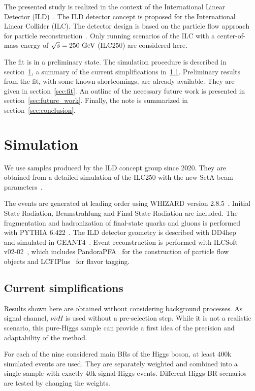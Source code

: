 \documentclass[11pt, hidelinks, a4paper]{scrartcl}
\newcommand{\eV}{\text{e\kern-0.15ex V}\xspace}
\newcommand{\GeV}{\text{G\eV}\xspace}
\begin{document}
The presented study is realized in the context of the
International Linear Detector (ILD)~\cite{ILD_DBD,ILD_IDR}.
The ILD detector concept is proposed for the International Linear Collider (ILC).
The detector design is based on the particle flow approach
for particle reconstruction~\cite{ParticleFlow}.
Only running scenarios of the ILC
with a center-of-mass energy of $\sqrt{s}=250~\GeV$ (ILC250)
are considered here.

The fit is in a preliminary state.
The simulation procedure is described in section~\ref{sec:simulation},
a summary of the
current simplifications in~\ref{subsec:simplifications}.
Preliminary results from the fit,
with some known shortcomings, are already available.
They are given in section~\ref{sec:fit}.
An outline of the necessary future work is presented
in section~\ref{sec:future_work}.
Finally, the note is summarized in section~\ref{sec:conclusion}.

\section{Simulation}\label{sec:simulation}
We use samples produced by the ILD concept group since 2020.
They are obtained from a detailed simulation of the ILC250
with the new SetA beam parameters~\cite{ILC_Staging_2017}.

The events are generated at leading order using
WHIZARD version 2.8.5~\cite{whizard,omega}.
Initial State Radiation, Beamstrahlung and Final State Radiation are included.
The fragmentation and hadronization of final-state quarks and gluons
is performed with PYTHIA 6.422~\cite{pythia}.
The ILD detector geometry is described with DD4hep~\cite{DD4hep}
and simulated in GEANT4~\cite{GEANT4}.
Event reconstruction is performed with ILCSoft v02-02~\cite{ILCSoft},
which includes PandoraPFA~\cite{PandoraPFA} for
the construction of particle flow objects
and LCFIPlus~\cite{LCFIPlus} for flavor tagging.

\subsection{Current simplifications}\label{subsec:simplifications}
Results shown here are obtained without considering background processes.
As signal channel, $\nu \bar{\nu} H$ is used without a pre-selection step.
While it is not a realistic scenario,
this pure-Higgs sample can provide a first idea
of the precision and adaptability of the method.

For each of the nine considered main BRs of the Higgs boson,
at least 400k simulated events are used.
They are separately weighted and combined into a single sample
with exactly 40k signal Higgs events.
Different Higgs BR scenarios are tested by changing the weights.
\end{document}
